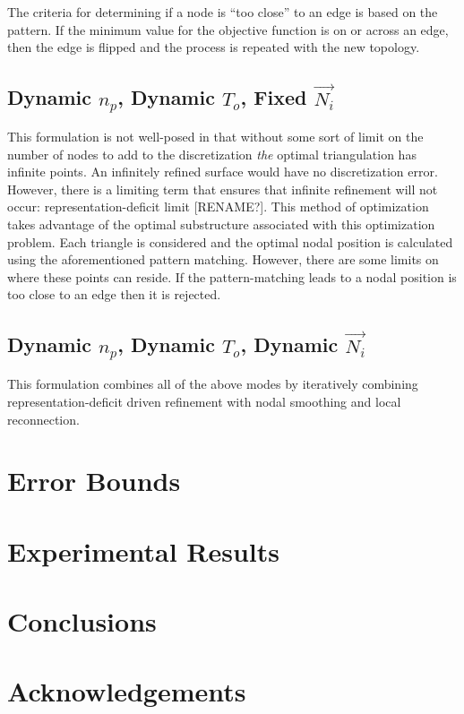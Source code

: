 \documentclass[11pt]{article}
\begin{document}
The criteria for determining if a node is ``too close'' to an edge is
based on the pattern. If the minimum value for the objective function is
on or across an edge, then the edge is flipped and the process is
repeated with the new topology.

\subsection{Dynamic $n_p$, Dynamic $T_o$, Fixed $\vec{N_i}$}
This formulation is not well-posed in that without some sort of limit on
the number of nodes to add to the discretization {\it the} optimal
triangulation has infinite points. An infinitely refined surface would
have no discretization error. However, there is a limiting term that
ensures that infinite refinement will not occur: representation-deficit
limit [RENAME?]. This method of optimization takes advantage of the
optimal substructure associated with this optimization problem. Each
triangle is considered and the optimal nodal position is calculated
using the aforementioned pattern matching. However, there are some
limits on where these points can reside. If the pattern-matching leads
to a nodal position is too close to an edge then it is rejected.

\subsection{Dynamic $n_p$, Dynamic $T_o$, Dynamic $\vec{N_i}$}
This formulation combines all of the above modes by iteratively
combining representation-deficit driven refinement with nodal smoothing
and local reconnection.

\section{Error Bounds}
\section{Experimental Results}
\section{Conclusions}
\section{Acknowledgements}
\end{document}
